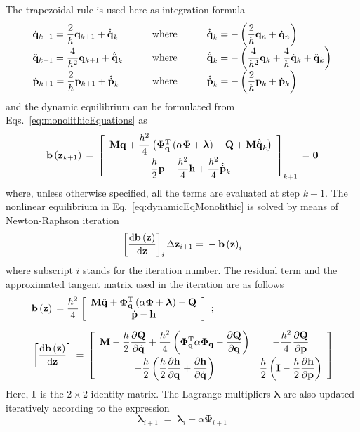 \documentclass[fleqn,11pt]{article}
\newcommand{\plbr}[1]{ \left( #1 \right) }
\newcommand{\sqbr}[1]{ \left[ #1 \right] }
\newcommand{\matr}[2]{ \sqbr{\begin{array}{ #1 } #2 \end{array} }}
\newcommand{\matrArray}[2]{ \begin{array}{ #1 } #2 \end{array} }
\newcommand{\partialD}[2]{ \dfrac{\partial #1}{\partial #2}}
\newcommand{\totalD}[2]{ \dfrac{{\rm d} #1}{{\rm d} #2}}
\newcommand{\trans}		{ ^{\rm T} }
\newcommand{\zero}		{ {\bf 0} }
\newcommand{\eye}		{ {\bf I} }
\newcommand{\eq}		{ {\;=\;} }
\newcommand{\pos}		{ {\bf{q}} }
\newcommand{\vel}		{ {{\dot{\bf{q}}}} }
\newcommand{\acc}		{ {\ddot{\bf{q}}} }
\newcommand{\Mass}		{ {\bf{M}} }
\newcommand{\ctr}		{ {\bm \Phi} }
\newcommand{\ctrJac}	{ {\bm \Phi}_{\pos} }
\newcommand{\fgen}		{ {\bf Q} }
\newcommand{\LagMult}	{ {\bm \lambda} }
\newcommand{\pres}		{ {\bf{p}} }
\newcommand{\presd}		{ {\dot{\bf{p}}} }
\begin{document}
The trapezoidal rule \cite{Newmark1959} is used here as integration formula
\begin{equation}
	\matrArray{lcccl}{
		\vel_{k+1} = \dfrac{2}{h}\pos_{k+1} + {\hat{\vel}}_{k} &\quad &{\rm where} &\quad 
		& {\hat{\vel}}_{k} = -\plbr{\dfrac{2}{h}\pos_n + \vel_n}
		\\[2mm]
		\acc_{k+1} = \dfrac{4}{h^2}\pos_{k+1} + {\hat{\acc}}_{k}  &\quad &{\rm where} &\quad 
		& {\hat{\acc}}_{k} = - \plbr{\dfrac{4}{h^2}\pos_{k} + \dfrac{4}{h}\vel_k + \acc_k}
		\\[2mm]
		\presd_{k+1} = \dfrac{2}{h}\pres_{k+1} + {\hat{\presd}}_k &\quad &{\rm where} &\quad 
		& {\hat{\presd}}_k = - \plbr{\dfrac{2}{h}\pres_k + \presd_k}
	}
	\label{eq:TR}
\end{equation}
and the dynamic equilibrium can be formulated from Eqs.~\eqref{eq:monolithicEquations} as
\begin{equation}
	{\bf b}\plbr{{\bf z}_{k+1}} \eq \matr{c}{
		\Mass\pos + \dfrac{h^2}{4} \plbr{\ctrJac\trans\plbr{\alpha\ctr + \LagMult} - \fgen + \Mass{\hat{\acc}}_{k}}
		\\[2mm]
		\dfrac{h}{2} \pres - \dfrac{h^2}{4}{\bf h} + \dfrac{h^2}{4}{\hat{\presd}}_{k}
	}_{k+1} \eq \zero
	\label{eq:dynamicEqMonolithic}
\end{equation}
where, unless otherwise specified, all the terms are evaluated at step $k+1$.
The nonlinear equilibrium in Eq.~\eqref{eq:dynamicEqMonolithic} is solved by means of Newton-Raphson iteration
\begin{equation}
	\sqbr{\totalD{{\bf b}\plbr{\bf z}}{\bf z}}_{i} \Delta {\bf z}_{i+1} \eq - {\bf b}\plbr{\bf z}_{i}
	\label{eq:NRMonolithic}
\end{equation}
where subscript $i$ stands for the iteration number. 
The residual term and the approximated tangent matrix used in the iteration are as follows
\begin{align}
	&{\bf b}\plbr{\bf z} \eq \dfrac{h^2}{4} \matr{c}{
		\Mass\acc + \ctrJac\trans \plbr{\alpha \ctr + \LagMult} - \fgen
		\\
		\presd - {\bf h}
	}\;;
	\notag \\[2mm]
	&\sqbr{\totalD{{\bf b}\plbr{\bf z}}{\bf z}} \eq \matr{cc}{
		\Mass - \dfrac{h}{2} \partialD{\fgen}{\vel} + \dfrac{h^2}{4} \plbr{\ctrJac\trans \alpha \ctrJac - \partialD{\fgen}{\pos}}
		&-\dfrac{h^2}{4} \partialD{\fgen}{\pres}
		\\[3mm]
		-\dfrac{h}{2} \plbr{\dfrac{h}{2}\partialD{{\bf h}}{\pos} + \partialD{{\bf h}}{\vel}}
		&\dfrac{h}{2}\plbr{\eye - \dfrac{h}{2}\partialD{\bf h}{\pres}}
	}
	\label{eq:NRMonolithicTerms}
\end{align}
Here, $\eye$ is the $2 \times 2$ identity matrix.
The Lagrange multipliers $\LagMult$ are also updated iteratively according to the expression
\begin{equation}
	\LagMult_{i+1} \eq \LagMult_{i} + \alpha \ctr_{i+1}
	\label{eq:NRupdateLagM}
\end{equation}
\end{document}
